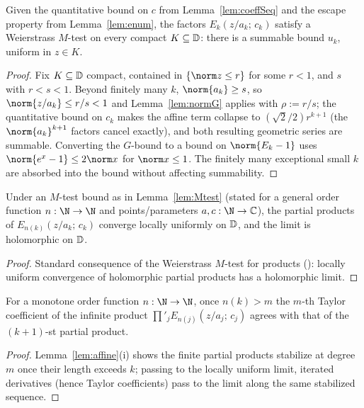 \begin{lemma}
  \label{lem:Mtest}
  \leanok
  Given the quantitative bound on $c$ from Lemma~\ref{lem:coeffSeq} and
  the escape property from Lemma~\ref{lem:enum}, the factors
  $E_k(z/a_k;\,c_k)$ satisfy a Weierstrass $M$-test on every compact
  $K \subseteq \mathbb{D}$: there is a summable bound $u_k$, uniform in $z \in K$.
\end{lemma}
\begin{proof}
  \leanok
  Fix $K \subseteq \mathbb{D}$ compact, contained in $\{\norm z \le r\}$ for some
  $r<1$, and $s$ with $r < s < 1$. Beyond finitely many $k$,
  $\norm{a_k} \ge s$, so $\norm{z/a_k} \le r/s < 1$ and
  Lemma~\ref{lem:normG} applies with $\rho := r/s$; the quantitative
  bound on $c_k$ makes the affine term collapse to
  $(\sqrt2/2)r^{k+1}$ (the $\norm{a_k}^{k+1}$ factors cancel exactly),
  and both resulting geometric series are summable. Converting the
  $G$-bound to a bound on $\norm{E_k - 1}$ uses
  $\norm{e^x - 1} \le 2\norm x$ for $\norm x \le 1$. The finitely many
  exceptional small $k$ are absorbed into the bound without affecting
  summability.
\end{proof}

\begin{lemma}
  \label{lem:holomorphicProduct}
  \leanok
  Under an $M$-test bound as in Lemma~\ref{lem:Mtest} (stated for a
  general order function $n : \N \to \N$ and points/parameters
  $a, c : \N \to \C$), the partial products of
  $E_{n(k)}(z/a_k;\,c_k)$ converge locally uniformly on $\mathbb{D}$, and the
  limit is holomorphic on $\mathbb{D}$.
\end{lemma}
\begin{proof}
  \leanok
  Standard consequence of the Weierstrass $M$-test for products
  (\cite[Ch.~5, Thm.~1.1]{Conway}): locally uniform convergence of
  holomorphic partial products has a holomorphic limit.
\end{proof}

\begin{lemma}
  \label{lem:taylorStabilize}
  \leanok
  For a monotone order function $n : \N \to \N$, once $n(k) > m$ the
  $m$-th Taylor coefficient of the infinite product
  $\prod'_j E_{n(j)}(z/a_j;\,c_j)$ agrees with that of the
  $(k+1)$-st partial product.
\end{lemma}
\begin{proof}
  \leanok
  Lemma~\ref{lem:affine}(i) shows the finite partial products stabilize
  at degree $m$ once their length exceeds $k$; passing to the locally
  uniform limit, iterated derivatives (hence Taylor coefficients) pass
  to the limit along the same stabilized sequence.
\end{proof}

